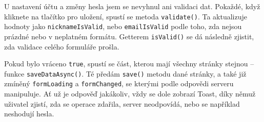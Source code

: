 U nastavení účtu a změny hesla jsem se nevyhnul ani validaci dat. Pokaždé, když kliknete na tlačítko pro uložení, spustí se metoda \texttt{validate()}. Ta aktualizuje hodnoty jako \texttt{nicknameIsValid}, nebo \texttt{emailIsValid} podle toho, zda nejsou prázdné nebo v neplatném formátu. Getterem \texttt{isValid()} se dá následně zjistit, zda validace celého formuláře prošla.

Pokud bylo vráceno \texttt{true}, spustí se část, kterou mají všechny stránky stejnou – funkce \texttt{saveDataAsync()}. Té předám \texttt{save()} metodu dané stránky, a také již zmíněný \texttt{formLoading} a \texttt{formChanged}, se kterými podle odpovědi serveru manipuluje. Ať už je odpověď jakákoliv, vždy se dole zobrazí Toast, díky němuž uživatel zjistí, zda se operace zdařila, server neodpovídá, nebo se například neshodují hesla.